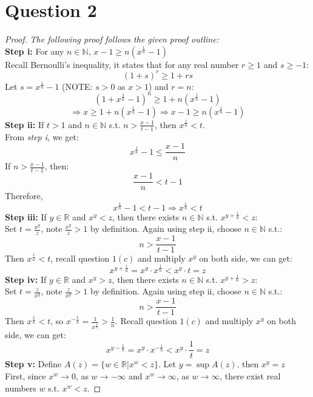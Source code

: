 \documentclass{article}
\begin{document}
\section*{Question 2}
\begin{proof}
    \textit{The following proof follows the given proof outline:}
    \\
    \textbf{Step i:} For any $n \in \mathbb{N}$, $x - 1 \geq n(x^{\frac{1}{n}} - 1)$
    \\
    Recall Bernoulli's inequality, it states that for any real number $r \geq 1$ and $s \geq -1$:
    \[ (1 + s)^r \geq 1 + rs \]
    Let $s = x^{\frac{1}{n}} - 1$ (NOTE: $s > 0$ as $x > 1$) and $r = n$:
    \[ (1 + x^{\frac{1}{n}} - 1)^n \geq 1 + n(x^{\frac{1}{n}} - 1) \]
    \[ \Rightarrow x \geq 1 + n(x^{\frac{1}{n}} - 1) \Rightarrow x - 1 \geq n(x^{\frac{1}{n}} - 1) \]
    \textbf{Step ii:} If $t > 1$ and $n \in \mathbb{N}$ s.t. $n > \frac{x - 1}{t - 1}$, then $x^\frac{1}{n} < t$.
    \\
    From \textit{step i}, we get:
    \[ x^{\frac{1}{n}} - 1 \leq \frac{x - 1}{n} \]
    If $n > \frac{x - 1}{t - 1}$, then:
    \[ \frac{x - 1}{n} < t - 1 \]
    Therefore,
    \[ x^{\frac{1}{n}} - 1 < t - 1 \Longrightarrow x^{\frac{1}{n}} < t \]
    \textbf{Step iii:} If $y \in \mathbb{R}$ and $x^y < z$, then there exists $n \in \mathbb{N}$ s.t. $x^{y + \frac{1}{n}} < z$:
    \\
    Set $t = \frac{x^y}{z}$, note $\frac{x^y}{z} > 1$ by definition. Again using step ii, choose $n \in \mathbb{N}$ s.t.:
    \[ n > \frac{x - 1}{t - 1} \]
    Then $x^{\frac{1}{n}} < t$, recall question $1(c)$ and multiply $x^y$ on both side, we can get:
    \[ x^{y + \frac{1}{n}} = x^y \cdot x^{\frac{1}{n}} < x^y \cdot t = z \]
    \textbf{Step iv:} If $y \in \mathbb{R}$ and $x^y > z$, then there exists $n \in \mathbb{N}$ s.t. $x^{y + \frac{1}{n}} > z$:
    \\
    Set $t = \frac{z}{x^y}$, note $\frac{z}{x^y} > 1$ by definition. Again using step ii, choose $n \in \mathbb{N}$ s.t.:
    \[ n > \frac{x - 1}{t - 1} \]
    Then $x^{\frac{1}{n}} < t$, so $x^{-\frac{1}{n}} = \frac{1}{x^{\frac{1}{n}}} > \frac{1}{n}$. Recall question $1(c)$ and multiply $x^y$ on both side, we can get:
    \[ x^{y - \frac{1}{n}} = x^y \cdot x^{-\frac{1}{n}} < x^y \cdot \frac{1}{t} = z \]
    \textbf{Step v:} Define $A(z) = \{w \in \mathbb{R} | x^w < z \}$. Let $y = \sup A(z)$. then $x^y = z$
    \\
    First, since $x^w \rightarrow 0$, as $w \rightarrow - \infty$ and $x^w \rightarrow \infty$, as $w \rightarrow \infty$, there exist real numbers $w$ s.t. $x^w < z$.

\end{proof}
\end{document}
